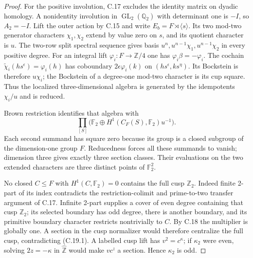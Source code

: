 \begin{proof}
For the positive involution, C.17 excludes the identity
matrix on dyadic homology.  A nonidentity involution
in $\operatorname{GL}_2(\mathbb Q_2)$ with determinant
one is $-I$, so $A_2=-I$.  Lift the outer action by
C.15 and write $E_b=F\rtimes\langle s\rangle$.
Its two mod-two generator characters $\chi_1,\chi_2$
extend by value zero on $s$, and its quotient character
is $u$.  The two-row split spectral sequence gives
basis $u^n,u^{n-1}\chi_1,u^{n-1}\chi_2$ in every
positive degree.  For an integral lift
$\varphi_i:F\to\mathbb Z/4$ one has
$\varphi_i\beta=-\varphi_i$.  The cochain
$\widetilde\chi_i(hs^\epsilon)=\varphi_i(h)$ has
coboundary $2\epsilon\varphi_i(k)$ on
$(hs^\epsilon,ks^\eta)$.  Its Bockstein is therefore
$u\chi_i$; the Bockstein of a degree-one mod-two
character is its cup square.  Thus the localized
three-dimensional algebra is generated by the
idempotents $\chi_i/u$ and is reduced.

Brown restriction identifies that algebra with
\[
 \prod_{[S]}\bigl(\mathbb F_2\oplus
 H^1(C_F(S),\mathbb F_2)u^{-1}\bigr).
                                                               \tag{C.19.1}
\]
Each second summand has square zero because its group
is a closed subgroup of the dimension-one group $F$.
Reducedness forces all these summands to vanish;
dimension three gives exactly three section classes.
Their evaluations on the two extended characters are
three distinct points of $\mathbb F_2^2$.

No closed $C\leq F$ with $H^1(C,\mathbb F_2)=0$
contains the full cusp $\mathbb Z_2$.  Indeed finite
2-part of its index contradicts the restriction-colimit
and prime-to-two transfer argument of C.17.  Infinite
2-part supplies a cover of even degree containing that
cusp $\mathbb Z_2$; its selected boundary has odd
degree, there is another boundary, and its primitive
boundary character restricts nontrivially to $C$.
By C.18 the multiplier is globally one.  A section
in the cusp normalizer would therefore centralize the
full cusp, contradicting (C.19.1).  A labelled cusp
lift has $v^2=c^\kappa$; if $\kappa_2$ were even,
solving $2z=-\kappa$ in $\widehat{\mathbb Z}$ would
make $vc^z$ a section.  Hence $\kappa_2$ is odd.


\end{proof}
